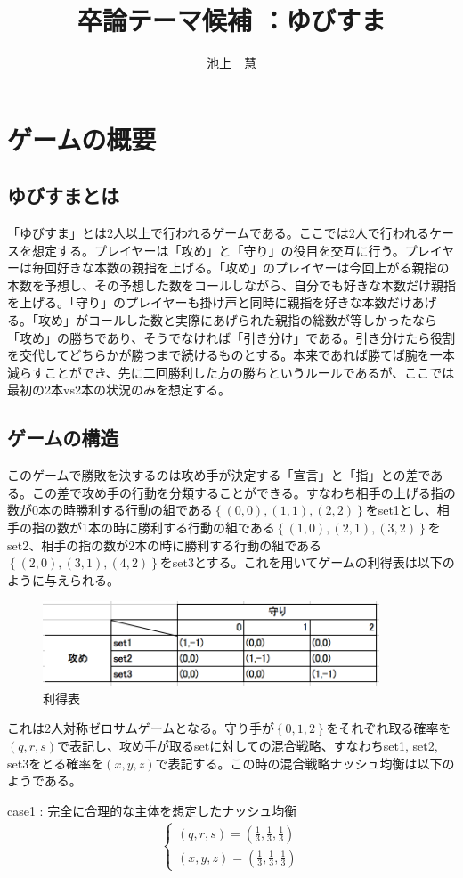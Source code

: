\documentclass{jsarticle}
\begin{document}
\title{卒論テーマ候補 ：ゆびすま}
\author{池上　慧}
\maketitle

\section{ゲームの概要}
\subsection{ゆびすまとは}
「ゆびすま」とは2人以上で行われるゲームである。ここでは2人で行われるケースを想定する。プレイヤーは「攻め」と「守り」の役目を交互に行う。プレイヤーは毎回好きな本数の親指を上げる。「攻め」のプレイヤーは今回上がる親指の本数を予想し、その予想した数をコールしながら、自分でも好きな本数だけ親指を上げる。「守り」のプレイヤーも掛け声と同時に親指を好きな本数だけあげる。「攻め」がコールした数と実際にあげられた親指の総数が等しかったなら「攻め」の勝ちであり、そうでなければ「引き分け」である。引き分けたら役割を交代してどちらかが勝つまで続けるものとする。本来であれば勝てば腕を一本減らすことができ、先に二回勝利した方の勝ちというルールであるが、ここでは最初の2本vs2本の状況のみを想定する。

\subsection{ゲームの構造}
このゲームで勝敗を決するのは攻め手が決定する「宣言」と「指」との差である。この差で攻め手の行動を分類することができる。すなわち相手の上げる指の数が0本の時勝利する行動の組である$\left\{ (0,0), (1,1), (2,2)\right\}$をset1とし、相手の指の数が1本の時に勝利する行動の組である$\left\{ (1,0), (2,1), (3,2)\right\}$をset2、相手の指の数が2本の時に勝利する行動の組である$\left\{ (2,0), (3,1), (4,2)\right\}$をset3とする。これを用いてゲームの利得表は以下のように与えられる。
\begin{figure}[h]
    \centering
    \includegraphics[width=10cm]{pmat.png}
    \caption{利得表}
\end{figure}

これは2人対称ゼロサムゲームとなる。守り手が$\left\{ 0,1,2\right\}$をそれぞれ取る確率を$(q,r,s)$で表記し、攻め手が取るsetに対しての混合戦略、すなわちset1, set2, set3をとる確率を$(x,y,z)$で表記する。この時の混合戦略ナッシュ均衡は以下のようである。
\begin{itembox}[l]{case1 : 完全に合理的な主体を想定したナッシュ均衡}
    \begin{align}
    	\begin{cases}
		(q, r, s) = (\frac{1}{3}, \frac{1}{3}, \frac{1}{3})\\
		(x, y, z) = (\frac{1}{3}, \frac{1}{3}, \frac{1}{3})
	\end{cases}
    \end{align}
\end{itembox}
\end{document}

